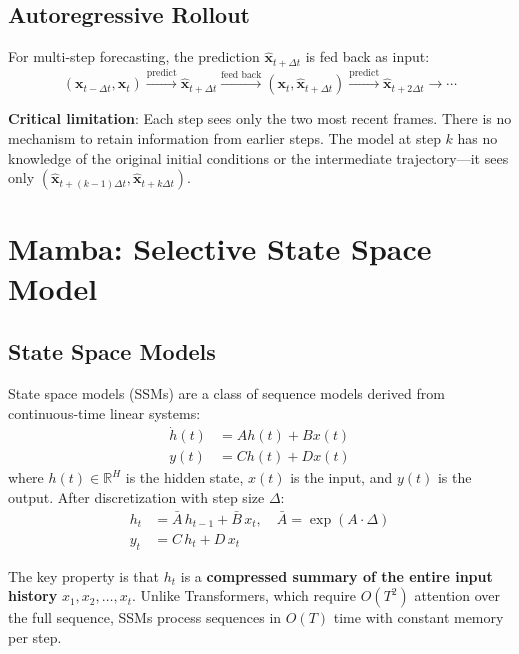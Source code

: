 \documentclass[11pt,a4paper]{article}
\begin{document}
\subsection{Autoregressive Rollout}

For multi-step forecasting, the prediction $\hat{\mathbf{x}}_{t+\Delta t}$ is fed back as input:
\[
(\mathbf{x}_{t-\Delta t}, \mathbf{x}_t) \xrightarrow{\text{predict}} \hat{\mathbf{x}}_{t+\Delta t} \xrightarrow{\text{feed back}} (\mathbf{x}_t, \hat{\mathbf{x}}_{t+\Delta t}) \xrightarrow{\text{predict}} \hat{\mathbf{x}}_{t+2\Delta t} \rightarrow \cdots
\]

\textbf{Critical limitation}: Each step sees only the two most recent frames. There is no mechanism to retain information from earlier steps. The model at step $k$ has no knowledge of the original initial conditions or the intermediate trajectory---it sees only $(\hat{\mathbf{x}}_{t+(k-1)\Delta t}, \hat{\mathbf{x}}_{t+k\Delta t})$.

\section{Mamba: Selective State Space Model}

\subsection{State Space Models}

State space models (SSMs) are a class of sequence models derived from continuous-time linear systems:
\begin{align}
  \dot{h}(t) &= A h(t) + B x(t) \\
  y(t) &= C h(t) + D x(t)
\end{align}
where $h(t) \in \mathbb{R}^H$ is the hidden state, $x(t)$ is the input, and $y(t)$ is the output. After discretization with step size $\Delta$:
\begin{align}
  h_t &= \bar{A} \, h_{t-1} + \bar{B} \, x_t, \quad \bar{A} = \exp(A \cdot \Delta) \label{eq:ssm_discrete} \\
  y_t &= C \, h_t + D \, x_t
\end{align}

The key property is that $h_t$ is a \textbf{compressed summary of the entire input history} $x_1, x_2, \ldots, x_t$. Unlike Transformers, which require $O(T^2)$ attention over the full sequence, SSMs process sequences in $O(T)$ time with constant memory per step.
\end{document}
